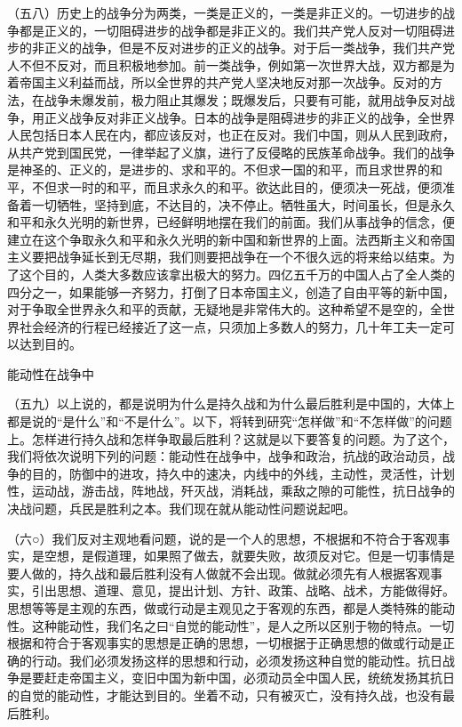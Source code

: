 \documentclass[UTF8, 12pt, a4paper]{ctexrep}
\begin{document}
（五八）历史上的战争分为两类，一类是正义的，一类是非正义的。一切进步的战争都是正义的，一切阻碍进步的战争都是非正义的。我们共产党人反对一切阻碍进步的非正义的战争，但是不反对进步的正义的战争。对于后一类战争，我们共产党人不但不反对，而且积极地参加。前一类战争，例如第一次世界大战，双方都是为着帝国主义利益而战，所以全世界的共产党人坚决地反对那一次战争。反对的方法，在战争未爆发前，极力阻止其爆发；既爆发后，只要有可能，就用战争反对战争，用正义战争反对非正义战争。日本的战争是阻碍进步的非正义的战争，全世界人民包括日本人民在内，都应该反对，也正在反对。我们中国，则从人民到政府，从共产党到国民党，一律举起了义旗，进行了反侵略的民族革命战争。我们的战争是神圣的、正义的，是进步的、求和平的。不但求一国的和平，而且求世界的和平，不但求一时的和平，而且求永久的和平。欲达此目的，便须决一死战，便须准备着一切牺牲，坚持到底，不达目的，决不停止。牺牲虽大，时间虽长，但是永久和平和永久光明的新世界，已经鲜明地摆在我们的前面。我们从事战争的信念，便建立在这个争取永久和平和永久光明的新中国和新世界的上面。法西斯主义和帝国主义要把战争延长到无尽期，我们则要把战争在一个不很久远的将来给以结束。为了这个目的，人类大多数应该拿出极大的努力。四亿五千万的中国人占了全人类的四分之一，如果能够一齐努力，打倒了日本帝国主义，创造了自由平等的新中国，对于争取全世界永久和平的贡献，无疑地是非常伟大的。这种希望不是空的，全世界社会经济的行程已经接近了这一点，只须加上多数人的努力，几十年工夫一定可以达到目的。

能动性在战争中

（五九）以上说的，都是说明为什么是持久战和为什么最后胜利是中国的，大体上都是说的“是什么”和“不是什么”。以下，将转到研究“怎样做”和“不怎样做”的问题上。怎样进行持久战和怎样争取最后胜利？这就是以下要答复的问题。为了这个，我们将依次说明下列的问题：能动性在战争中，战争和政治，抗战的政治动员，战争的目的，防御中的进攻，持久中的速决，内线中的外线，主动性，灵活性，计划性，运动战，游击战，阵地战，歼灭战，消耗战，乘敌之隙的可能性，抗日战争的决战问题，兵民是胜利之本。我们现在就从能动性问题说起吧。

（六○）我们反对主观地看问题，说的是一个人的思想，不根据和不符合于客观事实，是空想，是假道理，如果照了做去，就要失败，故须反对它。但是一切事情是要人做的，持久战和最后胜利没有人做就不会出现。做就必须先有人根据客观事实，引出思想、道理、意见，提出计划、方针、政策、战略、战术，方能做得好。思想等等是主观的东西，做或行动是主观见之于客观的东西，都是人类特殊的能动性。这种能动性，我们名之曰“自觉的能动性”，是人之所以区别于物的特点。一切根据和符合于客观事实的思想是正确的思想，一切根据于正确思想的做或行动是正确的行动。我们必须发扬这样的思想和行动，必须发扬这种自觉的能动性。抗日战争是要赶走帝国主义，变旧中国为新中国，必须动员全中国人民，统统发扬其抗日的自觉的能动性，才能达到目的。坐着不动，只有被灭亡，没有持久战，也没有最后胜利。
\end{document}
